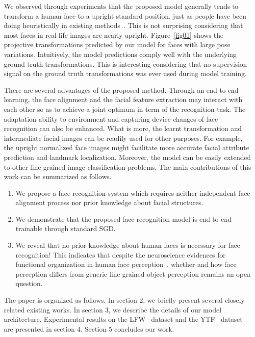 \documentclass[10pt,twocolumn,letterpaper]{article}
\begin{document}
We observed through experiments that the proposed model generally tends to transform a human face to a upright standard position, just as people have been doing heuristically in existing methods~\cite{sun2014deep,yi2014learning}. 
This is not surprising considering that most faces in real-life images are nearly upright. 
Figure~\ref{fig01} shows the projective transformations predicted by our model for faces with large pose variations. Intuitively, the model predictions comply well with the underlying ground truth transformations.
This is interesting considering that no supervision signal on the ground truth transformations was ever used during model training.

There are several advantages of the proposed method. 
Through an end-to-end learning, the face alignment and the facial feature extraction may interact with each other so as to achieve a joint optimum in term of the recognition task. 
The adaptation ability to environment and capturing device changes of face recognition can also be enhanced. 
What is more, the learnt transformation and intermediate facial images can be readily used for other purposes. 
For example, the upright normalized face images might facilitate more accurate facial attribute prediction and landmark localization. 
Moreover, the model can be easily extended to other fine-grained image classification problems. 
The main contributions of this work can be summarized as follows.
\begin{enumerate}
	\item We propose a face recognition system which requires neither independent face alignment process nor prior knowledge about facial structures.
	\item We demonstrate that the proposed face recognition model is end-to-end trainable through standard SGD.
	\item We reveal that no prior knowledge about human faces is necessary for face recognition! This indicates that despite the neuroscience evidences for functional organization in human face perception~\cite{Kanwisher1997The}, whether and how face perception differs from generic fine-grained object perception remains an open question.
\end{enumerate}

The paper is organized as follows. In section 2, we briefly present several closely related existing works. In section 3, we describe the details of our model architecture. Experimental results on the LFW~\cite{LFWTech} dataset and the YTF~\cite{Wolf2011Face} dataset are presented in section 4. Section 5 concludes our work.
\end{document}
